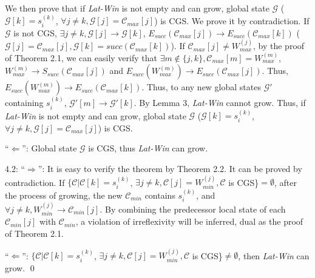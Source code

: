 \documentclass[12pt,journal,letterpaper,compsoc]{IEEEtran}
\begin{document}
We then prove that if {\it Lat-Win} is not empty and can grow, global state $\mathcal{G}$ ($\mathcal{G}[k] = s^{(k)}_{i}$, $\forall j \neq k, \mathcal{G}[j] = \mathcal{C}_{max}[j]$) is CGS. We prove it by contradiction. If $\mathcal{G}$ is not CGS, $\exists j\neq k, \mathcal{G}[j]\rightarrow \mathcal{G}[k]$, $E_{succ}(\mathcal{C}_{max}[j]) \rightarrow E_{succ}(\mathcal{C}_{max}[k])$ ($\mathcal{G}[j] = \mathcal{C}_{max}[j], \mathcal{G}[k] = succ(\mathcal{C}_{max}[k])$). If $\mathcal{C}_{max}[j] \neq W^{(j)}_{max}$, by the proof of Theorem 2.1, we can easily verify that $\exists m\not\in \{j, k\}, \mathcal{C}_{max}[m] = W^{(m)}_{max}$, $W^{(m)}_{max}\rightarrow S_{succ}(\mathcal{C}_{max}[j])$ and $E_{succ}(W^{(m)}_{max}) \rightarrow E_{succ}(\mathcal{C}_{max}[j])$. Thus, $E_{succ}(W^{(m)}_{max}) \rightarrow E_{succ}(\mathcal{C}_{max}[k])$. Thus, to any new global states $\mathcal{G}'$ containing $s^{(k)}_{i}$, $\mathcal{G}'[m] \rightarrow \mathcal{G}'[k]$. By Lemma 3, {\it Lat-Win} cannot grow. Thus, if {\it Lat-Win} is not empty and can grow, global state $\mathcal{G}$ ($\mathcal{G}[k] = s^{(k)}_{i}$, $\forall j \neq k, \mathcal{G}[j] = \mathcal{C}_{max}[j]$) is CGS.

``$\Leftarrow$'': Global state $\mathcal{G}$ is CGS, thus {\it Lat-Win} can grow.

4.2: ``$\Rightarrow$'': It is easy to verify the theorem by Theorem 2.2. It can be proved by contradiction. If $\{\mathcal{C}|\mathcal{C}[k] = s^{(k)}_i$, $\exists j\neq k, \mathcal{C}[j] = W^{(j)}_{min}, \mathcal{C}$ is CGS\}$ = \emptyset$, after the process of growing, the new $\mathcal{C}_{min}$ contains $s^{(k)}_i$, and $\forall j\neq k, W^{(j)}_{min} \rightarrow \mathcal{C}_{min}[j]$. By combining the predecessor local state of each $\mathcal{C}_{min}[j]$ with $\mathcal{C}_{min}$, a violation of irreflexivity will be inferred, dual as the proof of Theorem 2.1.

``$\Leftarrow$'': $\{\mathcal{C}|\mathcal{C}[k] = s^{(k)}_i$, $\exists j\neq k, \mathcal{C}[j] = W^{(j)}_{min}, \mathcal{C}$ is CGS\}$\neq \emptyset$, then {\it Lat-Win} can grow. \qed \\
\end{document}
